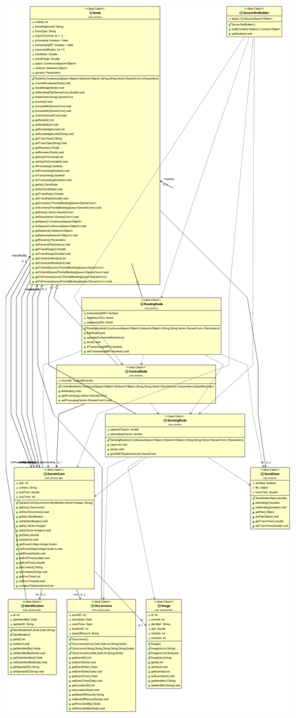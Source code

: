 \begin{appendices}
\chapter{}\label{appendix:sims:class}
\includegraphics[width=\textwidth, height=\textheight]{App/figures/classd}


\end{appendices}
